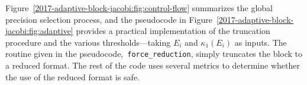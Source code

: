 Figure~\ref{2017-adaptive-block-jacobi:fig:control-flow} summarizes the global precision
selection process, and the pseudocode in Figure~\ref{2017-adaptive-block-jacobi:fig:adaptive} provides a
practical implementation of the truncation procedure and the various 
thresholds---taking $E_i$ and $\kappa_1(E_i)$ as inputs. The routine 
given in the pseudocode,~{\tt \small force\_reduction}, simply truncates the 
\fpd block to a reduced format. The rest of the code uses several metrics
to determine whether the use of the reduced format is safe.

